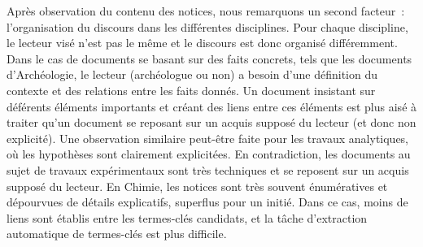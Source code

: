   Après observation du contenu des notices, nous remarquons un second facteur~:
  l'organisation du discours dans les différentes disciplines. Pour chaque
  discipline, le lecteur visé n'est pas le même et le discours est donc organisé
  différemment. Dans le cas de documents se basant sur des faits concrets, tels
  que les documents d'Archéologie, le lecteur (archéologue ou non) a besoin
  d'une définition du contexte et des relations entre les faits donnés. Un
  document insistant sur déférents éléments importants et créant des liens entre
  ces éléments est plus aisé à traiter qu'un document se reposant sur un acquis
  supposé du lecteur (et donc non explicité). Une observation similaire
  peut-être faite pour les travaux analytiques, où les hypothèses sont
  clairement explicitées. En contradiction, les documents au sujet de travaux
  expérimentaux sont très techniques et se reposent sur un acquis supposé du
  lecteur. En Chimie, les notices sont très souvent énumératives et dépourvues
  de détails explicatifs, superflus pour un initié. Dans ce cas, moins de liens
  sont établis entre les termes-clés candidats, et la tâche d'extraction
  automatique de termes-clés est plus difficile.

